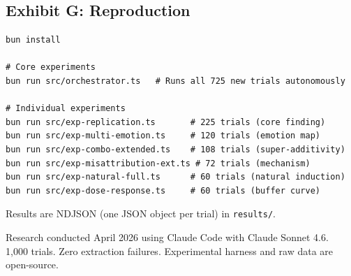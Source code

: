 \documentclass[11pt, a4paper]{article}
\begin{document}
\subsection*{Exhibit G: Reproduction}

{\small
\begin{verbatim}
bun install

# Core experiments
bun run src/orchestrator.ts   # Runs all 725 new trials autonomously

# Individual experiments
bun run src/exp-replication.ts       # 225 trials (core finding)
bun run src/exp-multi-emotion.ts     # 120 trials (emotion map)
bun run src/exp-combo-extended.ts    # 108 trials (super-additivity)
bun run src/exp-misattribution-ext.ts # 72 trials (mechanism)
bun run src/exp-natural-full.ts      # 60 trials (natural induction)
bun run src/exp-dose-response.ts     # 60 trials (buffer curve)
\end{verbatim}
}

Results are NDJSON (one JSON object per trial) in \texttt{results/}.

\vfill
{\small\color{mutedtext} Research conducted April 2026 using Claude Code with Claude Sonnet 4.6.\\
1{,}000 trials. Zero extraction failures. Experimental harness and raw data are open-source.}
\end{document}
